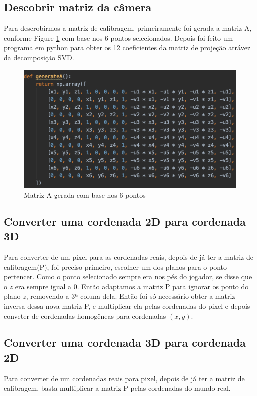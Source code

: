 \documentclass{article}
\begin{document}
    \subsection{Descobrir matriz da câmera}
    Para descrobirmos a matriz de calibragem, primeiramente foi gerada a matriz A, conforme Figure \ref{fig:matrizA1}  com base nos 6 pontos selecionados. Depois foi feito um programa em python para obter os 12 coeficientes da matriz de projeção atrávez da decomposição SVD.
        \begin{figure}[h!]
            \centering
            \includegraphics[scale=0.6]{matrizA1.png}
            \caption{Matriz A gerada com base nos 6 pontos}
            \label{fig:matrizA1}
        \end{figure}

    \subsection{Converter uma cordenada 2D para cordenada 3D}
    Para converter de um pixel para as cordenadas reais, depois de já ter a matriz de calibragem(P), foi preciso primeiro, escolher um dos planos para o ponto pertencer. Como o ponto selecionado sempre era nos pés do jogador, se disse que o \(z\) era sempre igual a 0. Então adaptamos a matriz P para ignorar os ponto do plano \(z\), removendo a 3ª coluna dela. Então foi só necessário obter a matriz inversa dessa nova matriz P, e multiplicar ela pelas cordenadas do pixel e depois conveter de cordenadas homogêneas para cordenadas  \((x, y)\).

    \subsection{Converter uma cordenada 3D para cordenada 2D}
    Para converter de um cordenadas reais para pixel, depois de já ter a matriz de calibragem, basta multiplicar a matriz P pelas cordenadas do mundo real.
\end{document}
